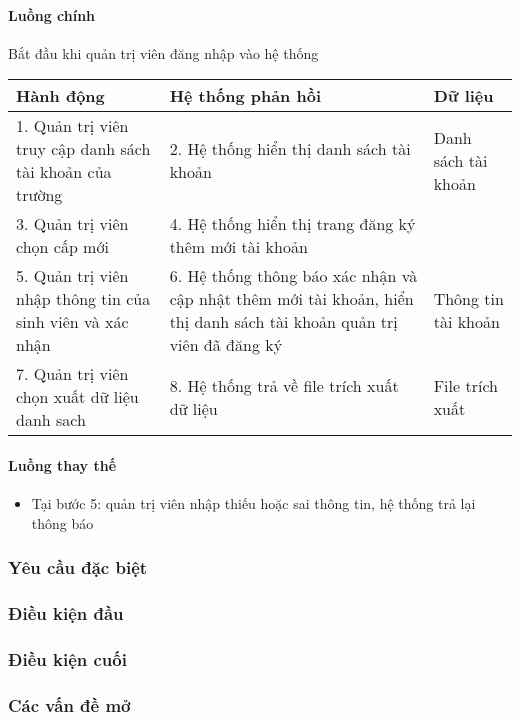 \documentclass[./../main_file.tex]{subfiles}
\begin{document}
\paragraph{Luồng chính}
 Bắt đầu khi quản trị viên đăng nhập vào hệ thống
 \begin{table}[H]
 				\begin{tabular}{|p{.33\textwidth}|p{}|p{}|}
 		\hline
 		\textbf{Hành động}                                       & \textbf{Hệ thống phản hồi}                            & \textbf{Dữ liệu}    \\ \hline
 		1. Quản trị viên truy cập danh sách tài khoản của trường & 2. Hệ thống hiển thị danh sách tài khoản              & Danh sách tài khoản \\ \hline
 		3. Quản trị viên chọn cấp mới                            & 4. Hệ thống hiển thị trang đăng ký thêm mới tài khoản &                     \\ \hline
 		5. Quản trị viên nhập thông tin của sinh viên và  xác nhận &
 		6. Hệ thống thông báo xác nhận và cập nhật thêm mới tài khoản, hiển thị danh sách tài khoản quản trị viên đã đăng ký &
 		Thông tin tài khoản \\ \hline
 		7. Quản trị viên chọn xuất dữ liệu danh sach             & 8. Hệ thống trả về file trích xuất dữ liệu            & File trích xuất     \\ \hline
 	\end{tabular}
 \end{table}
\paragraph{Luồng thay thế}
\begin{itemize}
	\item Tại bước 5: quản trị viên nhập thiếu hoặc sai thông tin, hệ thống trả lại thông báo
\end{itemize}
\subsubsection{Yêu cầu đặc biệt}
\subsubsection{Điều kiện đầu}
\subsubsection{Điều kiện cuối}
\subsubsection{Các vấn đề mở}
\end{document}
